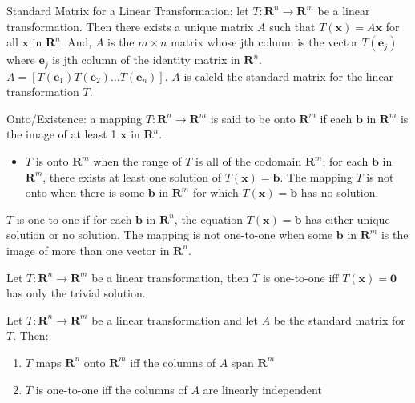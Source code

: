 \documentclass[../linalg.tex]{subfiles}
\begin{document}
\begin{theorem}
    Standard Matrix for a Linear Transformation: let $T:\textbf{R}^n\rightarrow \textbf{R}^m$ be a linear transformation. Then there exists a unique matrix $A$ such that 
    $T(\textbf{x})=A\textbf{x}$ for all $\textbf{x}$ in $\textbf{R}^n$. And, $A$ is the $m\times n$ matrix whose jth column is the vector $T(\textbf{e}_j)$ where $\textbf{e}_j$ is jth column 
    of the identity matrix in $\textbf{R}^n$. $A=[T(\textbf{e}_1)T(\textbf{e}_2)\dots T(\textbf{e}_n)]$. $A$ is caleld the standard matrix for the linear transformation $T$.
\end{theorem}

Onto/Existence: a mapping $T:\textbf{R}^n\rightarrow \textbf{R}^m$ is said to be onto $\textbf{R}^m$ if each $\textbf{b}$ in $\textbf{R}^m$ is the image of at least 1 $\textbf{x}$ in $\textbf{R}^n$.
\begin{itemize}
    \item $T$ is onto $\textbf{R}^m$ when the range of $T$ is all of the codomain $\textbf{R}^m$; for each $\textbf{b}$ in $\textbf{R}^m$, there exists at least one solution of $T(\textbf{x})=\textbf{b}$. The mapping $T$ is not onto when there is some $\textbf{b}$ in $\textbf{R}^m$ for which $T(\textbf{x})=\textbf{b}$ has no solution.
\end{itemize}
$T$ is one-to-one if for each $\textbf{b}$ in $\textbf{R}^n$, the equation $T(\textbf{x})=\textbf{b}$ has either unique solution or no solution. The mapping is not one-to-one when some $\textbf{b}$ in $\textbf{R}^m$ is the image of more than one vector in $\textbf{R}^n$.
\begin{theorem}
    Let $T:\textbf{R}^n\rightarrow \textbf{R}^m$ be a linear transformation, then $T$ is one-to-one iff $T(\textbf{x})=\textbf{0}$ has only the trivial solution.
\end{theorem}

\begin{theorem}
    Let $T:\textbf{R}^n\rightarrow \textbf{R}^m$ be a linear transformation and let $A$ be the standard matrix for $T$. Then:
    \begin{enumerate}
        \item $T$ maps $\textbf{R}^n$ onto $\textbf{R}^m$ iff the columns of $A$ span $\textbf{R}^m$
        \item $T$ is one-to-one iff the columns of $A$ are linearly independent
    \end{enumerate}
\end{theorem}
\end{document}
